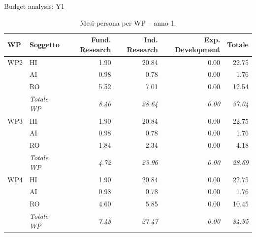 \documentclass[aspectratio=169,10pt]{beamer}
\begin{document}
\begin{frame}{Budget analysis: Y1}
  
\begin{table}[H]\centering\scriptsize\caption{Mesi-persona per WP -- anno 1.}\label{tab:wp-w-y1}
\begin{tabular}{llrrrr}\toprule\textbf{WP} & \textbf{Soggetto} & \textbf{Fund. Research} & \textbf{Ind. Research} & \textbf{Exp. Development} & \textbf{Totale} \\\midrule
WP2 & HI & 1.90 & 20.84 & 0.00 & 22.75 \\
 & AI & 0.98 & 0.78 & 0.00 & 1.76 \\
 & RO & 5.52 & 7.01 & 0.00 & 12.54 \\
 & \textit{Totale WP} & \textit{8.40} & \textit{28.64} & \textit{0.00} & \textit{37.04} \\\midrule
WP3 & HI & 1.90 & 20.84 & 0.00 & 22.75 \\
 & AI & 0.98 & 0.78 & 0.00 & 1.76 \\
 & RO & 1.84 & 2.34 & 0.00 & 4.18 \\
 & \textit{Totale WP} & \textit{4.72} & \textit{23.96} & \textit{0.00} & \textit{28.69} \\\midrule
WP4 & HI & 1.90 & 20.84 & 0.00 & 22.75 \\
 & AI & 0.98 & 0.78 & 0.00 & 1.76 \\
 & RO & 4.60 & 5.85 & 0.00 & 10.45 \\
 & \textit{Totale WP} & \textit{7.48} & \textit{27.47} & \textit{0.00} & \textit{34.95} \\
\bottomrule\end{tabular}
\end{table}
\end{frame}
\end{document}
